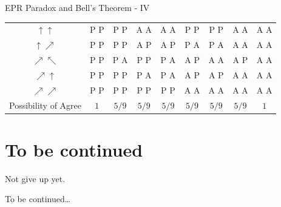 \documentclass{beamer}
\begin{document}
\begin{frame}{EPR Paradox and Bell's Theorem - IV}
{\begin{table}[h!]
\begin{center}
\begin{tabular}{c|c|c|c|c|c|c|c|c}
      $\uparrow \uparrow$ & P          P                  & P          P                  & A          A                  & A          A                  & P          P                  & P          P                  & A          A                  & A          A                  \\
      $\uparrow \nearrow$ & P          P                  & P          P                  & A          P                  & A          P                  & P          A                  & P          A                  & A          A                  & A          A                  \\
      $\nearrow \nwarrow$ & P          P                  & P          A                  & P          P                  & P          A                  & A          P                  & A          A                  & A          P                  & A          A                  \\
      $\nearrow \uparrow$ & P          P                  & P          P                  & P          A                  & P          A                  & A          P                  & A          P                  & A          A                  & A          A                  \\
      $\nearrow \nearrow$ & P          P                  & P          P                  & P          P                  & P          P                  & A          A                  & A          A                  & A          A                  & A          A                  \\
      \hline
     Possibility of Agree & $1$                           & $5/9$                         & $5/9$                         & $5/9$                         & $5/9$                         & $5/9$                         & $5/9$                         & $1$                           \\
    \end{tabular}
  \end{center}
  \end{table}
  }%
\end{frame}

\section{To be continued}
\begin{frame}
  Not give up yet.
  \par
  To be continued\dots
\end{frame}
\end{document}
